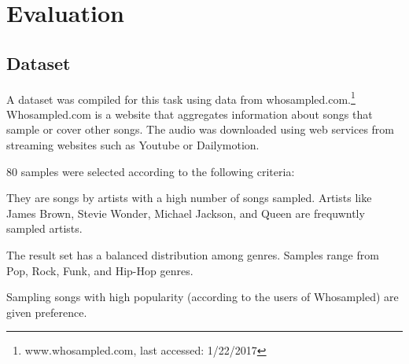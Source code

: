 \documentclass{article}
\begin{document}

\section{Evaluation}
\label{eval}

\subsection{Dataset}
A dataset was compiled for this task using data from whosampled.com.\footnote{www.whosampled.com, last accessed: 1/22/2017} Whosampled.com is a website that aggregates information about songs that sample or cover other songs. The audio was downloaded using web services from streaming websites such as Youtube or Dailymotion.

80 samples were selected according to the following criteria:
\begin{inparaenum}[(i)]
    \item   They are songs by artists with a high number of songs sampled. Artists like James Brown, Stevie Wonder, Michael Jackson, and Queen are frequwntly sampled artists.
    \item   The result set has a balanced distribution among genres. Samples range from Pop, Rock, Funk, and Hip-Hop genres.
	\item   Sampling songs with high popularity (according to the users of Whosampled) are given preference.
\end{inparaenum}
\end{document}
